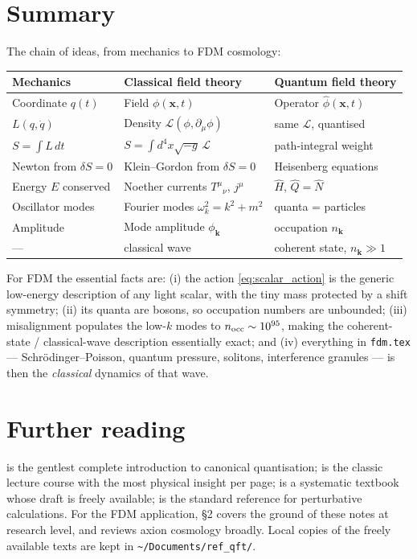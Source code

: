 \documentclass[12pt]{article}
\newcommand{\bk}{\mathbf{k}}
\newcommand{\bx}{\mathbf{x}}
\newcommand{\Lag}{\mathcal{L}}
\begin{document}
\section{Summary}
\label{sec:summary}

The chain of ideas, from mechanics to FDM cosmology:

\begin{center}
\begin{tabular}{@{}lll@{}}
\toprule
Mechanics & Classical field theory & Quantum field theory \\
\midrule
Coordinate $q(t)$ & Field $\phi(\bx,t)$ & Operator $\hat\phi(\bx,t)$ \\
$L(q,\dot q)$ & Density $\Lag(\phi,\partial_\mu\phi)$ & same $\Lag$, quantised \\
$S = \int L\,dt$ & $S = \int d^4x\sqrt{-g}\,\Lag$ & path-integral weight \\
Newton from $\delta S{=}0$ & Klein--Gordon from $\delta S{=}0$ & Heisenberg equations \\
Energy $E$ conserved & Noether currents $T^\mu{}_\nu$, $j^\mu$ & $\hat H$, $\hat Q = \hat N$ \\
Oscillator modes & Fourier modes $\omega_k^2 = k^2{+}m^2$ & quanta = particles \\
Amplitude & Mode amplitude $\phi_\bk$ & occupation $n_\bk$ \\
--- & classical wave & coherent state, $n_\bk \gg 1$ \\
\bottomrule
\end{tabular}
\end{center}

For FDM the essential facts are: (i) the action
\eqref{eq:scalar_action} is the generic low-energy description of any
light scalar, with the tiny mass protected by a shift symmetry;
(ii) its quanta are bosons, so occupation numbers are unbounded;
(iii) misalignment populates the low-$k$ modes to
$n_{\rm occ} \sim 10^{95}$, making the coherent-state / classical-wave
description essentially exact; and (iv) everything in
\texttt{fdm.tex} --- Schr\"odinger--Poisson, quantum pressure,
solitons, interference granules --- is then the \emph{classical}
dynamics of that wave.

\section*{Further reading}

\citet{Tong2007} is the gentlest complete introduction to canonical
quantisation; \citet{Coleman2011} is the classic lecture course with
the most physical insight per page; \citet{Srednicki2007} is a
systematic textbook whose draft is freely available;
\citet{PeskinSchroeder1995} is the standard reference for
perturbative calculations.  For the FDM application,
\citet{Hui2017} \S2 covers the ground of these notes at research
level, and \citet{Marsh2016} reviews axion cosmology broadly.
Local copies of the freely available texts are kept in
\texttt{\textasciitilde/Documents/ref\_qft/}.


\end{document}
